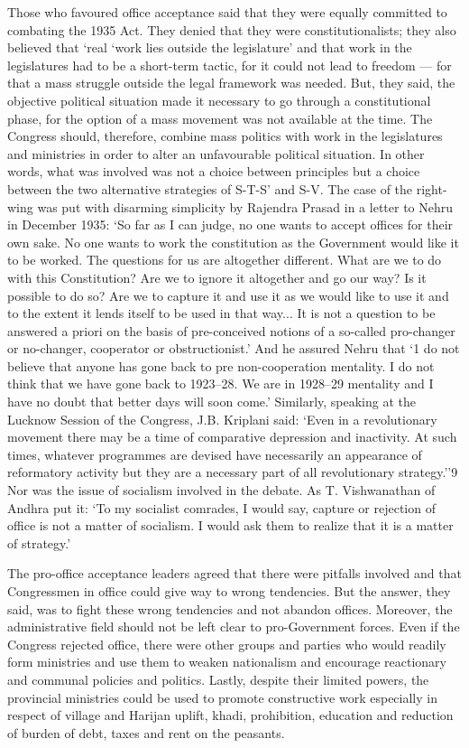 Those who favoured office acceptance said that they were equally committed to combating the 1935 Act. They denied that they were constitutionalists; they also believed that `real `work lies outside the legislature' and that work in the legislatures had to be a short-term tactic, for it could not lead to freedom --- for that a mass struggle outside the legal framework was needed. But, they said, the objective political situation made it necessary to go through a constitutional phase, for the option of a mass movement was not available at the time. The Congress should, therefore, combine mass politics with work in the legislatures and ministries in order to alter an unfavourable political situation. In other words, what was involved was not a choice between principles but a choice between the two alternative strategies of S-T-S' and S-V. The case of the right-wing was put with disarming simplicity by Rajendra Prasad in a letter to Nehru in December 1935: `So far as I can judge, no one wants to accept offices for their own sake. No one wants to work the constitution as the Government would like it to be worked. The questions for us are altogether different. What are we to do with this Constitution? Are we to ignore it altogether and go our way? Is it possible to do so? Are we to capture it and use it as we would like to use it and to the extent it lends itself to be used in that way... It is not a question to be answered a priori on the basis of pre-conceived notions of a so-called pro-changer or no-changer, cooperator or obstructionist.' And he assured Nehru that `1 do not believe that anyone has gone back to pre non-cooperation mentality. I do not think that we have gone back to 1923--28. We are in 1928--29 mentality and I have no doubt that better days will soon come.' Similarly, speaking at the Lucknow Session of the Congress, J.B. Kriplani said: `Even in a revolutionary movement there may be a time of comparative depression and inactivity. At such times, whatever programmes are devised have necessarily an appearance of reformatory activity but they are a necessary part of all revolutionary strategy.''9 Nor was the issue of socialism involved in the debate. As T. Vishwanathan of Andhra put it: `To my socialist comrades, I would say, capture or rejection of office is not a matter of socialism. I would ask them to realize that it is a matter of strategy.' 

The pro-office acceptance leaders agreed that there were pitfalls involved and that Congressmen in office could give way to wrong tendencies. But the answer, they said, was to fight these wrong tendencies and not abandon offices. Moreover, the administrative field should not be left clear to pro-Government forces. Even if the Congress rejected office, there were other groups and parties who would readily form ministries and use them to weaken nationalism and encourage reactionary and communal policies and politics. Lastly, despite their limited powers, the provincial ministries could be used to promote constructive work especially in respect of village and Harijan uplift, khadi, prohibition, education and reduction of burden of debt, taxes and rent on the peasants. 

